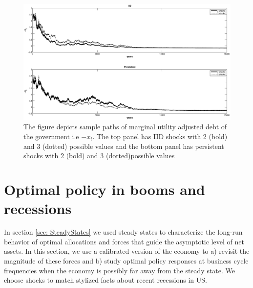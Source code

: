 \documentclass[thmsb,11pt]{article}
\begin{document}
%
%
   \begin{figure}[htp]
  \centering
  \includegraphics[width=\textwidth]{Draft25Graphs/generalshocks_x.eps}
  \caption{The figure depicts sample paths of marginal utility adjusted debt of the government i.e  $-x_t$. The top panel has IID shocks with 2 (bold) and 3 (dotted) possible values and the bottom panel has persistent shocks with 2 (bold) and 3 (dotted)possible values}
 \label{fig:moregeneralshocks}
  \end{figure}

\section{\protect\smallskip Optimal policy in booms and recessions}\label{Sec: numerical}

\smallskip

In section \ref{sec: SteadyStates} we used steady states to characterize the long-run behavior of optimal allocations and forces that guide the asymptotic level of net assets. In this section, we use a calibrated version of the economy to a) revisit the magnitude of these forces and b) study optimal policy responses at business cycle frequencies when the economy is possibly far away from the steady state. We choose shocks to match stylized facts about recent
recessions in US.



%




%
\end{document}
